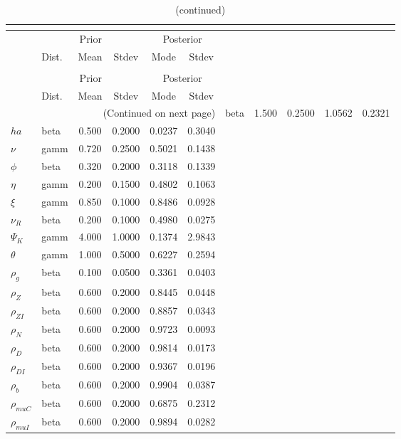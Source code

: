  
\begin{center}
\begin{longtable}{llcccc} 
\caption{Results from posterior maximization (parameters)}\\
 \label{Table:Posterior:1}\\
\toprule 
  & \multicolumn{3}{c}{Prior}  &  \multicolumn{2}{c}{Posterior} \\
  \cmidrule(r{.75em}){2-4} \cmidrule(r{.75em}){5-6}
  & Dist. & Mean  & Stdev & Mode & Stdev \\ 
\midrule \endfirsthead 
\caption{(continued)}\\
 \bottomrule 
  & \multicolumn{3}{c}{Prior}  &  \multicolumn{2}{c}{Posterior} \\
  \cmidrule(r{.75em}){2-4} \cmidrule(r{.75em}){5-6}
  & Dist. & Mean  & Stdev & Mode & Stdev \\ 
\midrule \endhead 
\bottomrule \multicolumn{6}{r}{(Continued on next page)}\endfoot 
\bottomrule\endlastfoot 
${\sigma}$ & beta &   1.500 & 0.2500 &   1.0562 &  0.2321 \\ 
${ha}$ & beta &   0.500 & 0.2000 &   0.0237 &  0.3040 \\ 
$\nu$ & gamm &   0.720 & 0.2500 &   0.5021 &  0.1438 \\ 
${\phi}$ & beta &   0.320 & 0.2000 &   0.3118 &  0.1339 \\ 
${\eta}$ & gamm &   0.200 & 0.1500 &   0.4802 &  0.1063 \\ 
$\xi$ & gamm &   0.850 & 0.1000 &   0.8486 &  0.0928 \\ 
${\nu_R}$ & beta &   0.200 & 0.1000 &   0.4980 &  0.0275 \\ 
${\Psi_{K}}$ & gamm &   4.000 & 1.0000 &   0.1374 &  2.9843 \\ 
${\theta}$ & gamm &   1.000 & 0.5000 &   0.6227 &  0.2594 \\ 
${\rho_g}$ & beta &   0.100 & 0.0500 &   0.3361 &  0.0403 \\ 
${\rho_Z}$ & beta &   0.600 & 0.2000 &   0.8445 &  0.0448 \\ 
${\rho_{ZI}}$ & beta &   0.600 & 0.2000 &   0.8857 &  0.0343 \\ 
${\rho_N}$ & beta &   0.600 & 0.2000 &   0.9723 &  0.0093 \\ 
${\rho_D}$ & beta &   0.600 & 0.2000 &   0.9814 &  0.0173 \\ 
${\rho_{DI}}$ & beta &   0.600 & 0.2000 &   0.9367 &  0.0196 \\ 
${\rho_b}$ & beta &   0.600 & 0.2000 &   0.9904 &  0.0387 \\ 
${\rho_{muC}}$ & beta &   0.600 & 0.2000 &   0.6875 &  0.2312 \\ 
${\rho_{muI}}$ & beta &   0.600 & 0.2000 &   0.9894 &  0.0282 \\ 
\end{longtable}
 \end{center}
